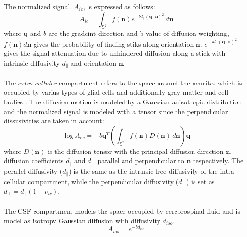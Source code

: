  The normalized signal, $A_{ic}$, is expressed as follows:
 \begin{equation}
   A_{ic} = \int_{\mathbb{S}^2} f(\mathbf{n})e^{-bd_{\parallel}(\mathbf{q\cdot n})^2} \,d\mathbf{n}
 \end{equation}
 where $\mathbf{q}$ and $b$ are the gradeint direction and b-value of diffusion-weighting, $f(\mathbf{n})d\mathbf{n}$ gives the probability of finding stiks along orientation $\mathbf{n}$. $e^{-bd_{\parallel}(\mathbf{q\cdot n})^2}$ gives the signal attenuation due to unhindered diffusion along a stick with intrinsic diffusivity $d_{\parallel}$ and orientation $\mathbf{n}$.
 \\\\
 The \emph{extra-cellular} compartment refers to the space around the neurites which is occupied by varius types of glial cells and additionally gray matter and cell bodies \cite{zhang2012noddi}. The diffusion motion is modeled by a Gaussian anisotropic distribution and the normalized signal is modeled with a tensor since the perpendicular dissusivities are taken in account:
 \begin{equation}
   \log A_{ec} = -b\mathbf{q}^T(\int_{\mathbb{S}^2} f(\mathbf{n})D(\mathbf{n})\,d\mathbf{n})\mathbf{q}
 \end{equation}
 where $D(\mathbf{n})$ is the diffusion tensor with the principal diffusion direction $\mathbf{n}$, diffusion coefficients $d_{\parallel}$ and $d_{\perp}$ parallel and perpendicular to $\mathbf{n}$ respectively. The perallel diffusivity ($d_{\parallel}$) is the same as the intrinsic free diffusivity of the intra-cellular compartment, while the perpendicular diffusivity ($d_{\perp}$) is set as $d_{\perp} = d_{\parallel}(1-\nu_{ic})$.
 \\\\
 The CSF compartment models the space occupied by cerebrospinal fluid and is model as isotropv Gaussian diffusion with diffusivity $d_{iso}$.
 \begin{equation}
   A_{ios} = e^{-b d_{iso}}
 \end{equation}
